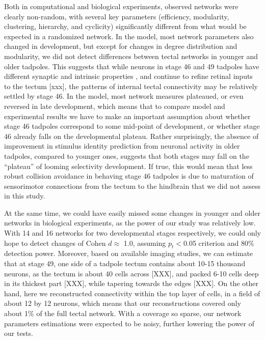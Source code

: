 \documentclass{article}
\begin{document}
Both in computational and biological experiments, observed networks were clearly non-random, with several key parameters (efficiency, modularity, clustering, hierarchy, and cyclicity) significantly different from what would be expected in a randomized network. In the model, most network parameters also changed in development, but except for changes in degree distribution and modularity, we did not detect differences between tectal networks in younger and older tadpoles. This suggests that while neurons in stage 46 and 49 tadpoles have different synaptic and intrinsic properties \citep{ciarleglio2015}, and continue to refine retinal inputs to the tectum \citep{tao2005refinement,munz2014hebbian}[xxx], the patterns of internal tectal connectivity may be relatively settled by stage 46. In the model, most network measures plateaued, or even reversed in late development, which means that to compare model and experimental results we have to make an important assumption about whether stage 46 tadpoles correspond to some mid-point of development, or whether stage 46 already falls on the developmental plateau. Rather surprisingly, the absence of improvement in stimulus identity prediction from neuronal activity in older tadpoles, compared to younger ones, suggests that both stages may fall on the “plateau” of looming selectivity development. If true, this would mean that less robust collision avoidance in behaving stage 46 tadpoles \citep{dong2009} is due to maturation of sensorimotor connections from the tectum to the hindbrain that we did not assess in this study.

At the same time, we could have easily missed some changes in younger and older networks in biological experiments, as the power of our study was relatively low. With 14 and 16 networks for two developmental stages respectively, we could only hope to detect changes of Cohen $d \approx$ 1.0, assuming $p_t<$0.05 criterion and 80\% detection power. Moreover, based on available imaging studies, we can estimate that at stage 49, one side of a tadpole tectum contains about 10-15 thousand neurons, as the tectum is about 40 cells across [XXX], and packed 6-10 cells deep in its thickest part [XXX], while tapering towards the edges [XXX]. On the other hand, here we reconstructed connectivity within the top layer of cells, in a field of about 12 by 12 neurons, which means that our reconstructions covered only about 1\% of the full tectal network. With a coverage so sparse, our network parameters estimations were expected to be noisy, further lowering the power of our tests.
\end{document}
